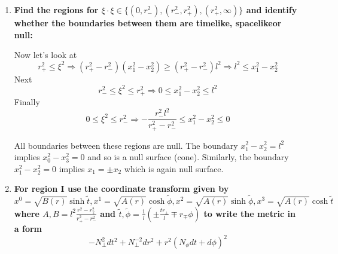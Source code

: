\documentclass[11pt, class=article, crop=false]{standalone}
\begin{document}
\begin{enumerate}
\begin{enumerate}
		 We can write:
		\[
			\xi = \frac{r_+}{l} (x_2 \d_1 - x_1 \d_2) - \frac{r_-}{l} (x_3 \d_0 - x_0 \d_3) = \begin{pmatrix}
				-\frac{r_-}{l} x_3\\
				\frac{r_+}{l} x_2\\
				-\frac{r_+}{l} x_1\\
				\frac{r_-}{l} x_0
			\end{pmatrix} = \begin{pmatrix}
				-\frac{r_-}{l} x^3\\
				\frac{r_+}{l} x^2\\
				\frac{r_+}{l} x^1\\
				-\frac{r_-}{l} x^0
			\end{pmatrix}
		\]
		This vector has norm:
		\[
			\xi^2 = \frac{1}{l^2} [r_+^2 (x_1^2 - x_2^2) - r_-^2 ( x_3^2 - x_0^2)] = \frac{1}{\ell^2} (r_+^2 - r_-^2)(x_1^2 - x_2^2) + r_-^2
		\]
		This is $\geq 0$ when (assuming $r_+ > r_-$)
		\[
			x_1^2 - x_2^2 \geq - \frac{r_-^2 l^2}{r_+^2 - r_-^2}
		\]
		\item
		 \textbf{Find the regions for $\xi \cdot \xi \in \{(0, r_-^2), (r_-^2, r_+^2), (r_+^2, \infty) \}$ and identify whether the boundaries between them are timelike, spacelikeor null:}
		
		 Now let's look at 
		\[
			r_+^2 \leq \xi^2 \Rightarrow (r_+^2 - r_-^2)(x_1^2 - x_2^2) \geq (r_+^2 - r_-^2) l^2 \Rightarrow l^2 \leq x_1^2 - x_2^2 
		\]
		Next
		\[
			r_-^2 \leq \xi^2 \leq r_+^2 \Rightarrow 0 \leq x_1^2 - x_2^2 \leq l^2
		\]
		Finally 
		\[
			0 \leq \xi^2 \leq r_-^2 \Rightarrow - \frac{r_-^2 l^2}{r_+^2 - r_-^2} \leq x_1^2 - x_2^2 \leq 0
		\]
	
		All boundaries between these regions are null. The boundary $x_1^2 - x_2^2 = l^2$ implies $x_0^2 - x_3^2 =0$ and so is a null surface (cone). 
		Similarly, the boundary $x_1^2 - x_2^2 = 0$ implies $x_1 = \pm x_2$ which is again null surface. 
	
		\item \textbf{For region I use the coordinate transform given by $x^0 = \sqrt{B(r)} \sinh \tilde t, x^1 = \sqrt{A(r)} \cosh \tilde \phi, x^2 = \sqrt{A(r)} \sinh \tilde \phi, x^3 = \sqrt{A(r)} \cosh \tilde t$ where $A,B = l^2 \frac{r^2 - r^2_\mp}{r^2_+ - r^2_-}$ and $\tilde t, \tilde \phi = \frac{1}{l} (\pm \frac{t r_\pm}{l} \mp r_\mp \phi)$ to write the metric in a form}
		\[
			-N_\perp^2 dt^2 + N_\perp^{-2} dr^2 + r^2 (N_\phi dt + d\phi)^2
		\]
		

\end{enumerate}
\end{enumerate}
\end{document}
